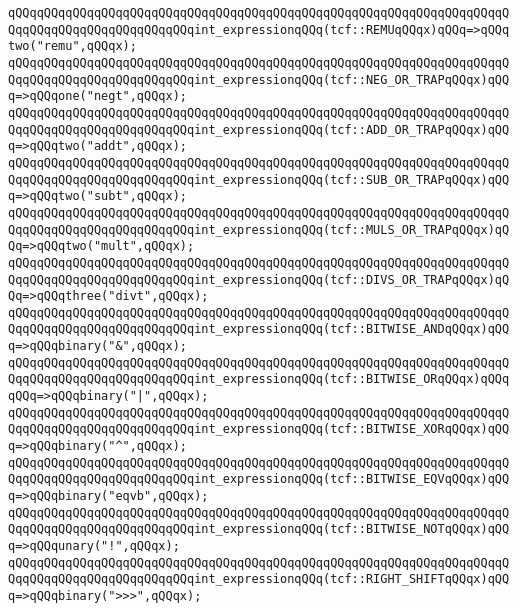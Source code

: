\verb|qQQqqQQqqQQqqQQqqQQqqQQqqQQqqQQqqQQqqQQqqQQqqQQqqQQqqQQqqQQqqQQqqQQqqQQqqQQqqQQqqQQqqQQqqQQqqQQqint_expressionqQQq(tcf::REMUqQQqx)qQQq=>qQQqtwo("remu",qQQqx);|\newline
\verb|qQQqqQQqqQQqqQQqqQQqqQQqqQQqqQQqqQQqqQQqqQQqqQQqqQQqqQQqqQQqqQQqqQQqqQQqqQQqqQQqqQQqqQQqqQQqqQQqint_expressionqQQq(tcf::NEG_OR_TRAPqQQqx)qQQq=>qQQqone("negt",qQQqx);|\newline
\verb|qQQqqQQqqQQqqQQqqQQqqQQqqQQqqQQqqQQqqQQqqQQqqQQqqQQqqQQqqQQqqQQqqQQqqQQqqQQqqQQqqQQqqQQqqQQqqQQqint_expressionqQQq(tcf::ADD_OR_TRAPqQQqx)qQQq=>qQQqtwo("addt",qQQqx);|\newline
\verb|qQQqqQQqqQQqqQQqqQQqqQQqqQQqqQQqqQQqqQQqqQQqqQQqqQQqqQQqqQQqqQQqqQQqqQQqqQQqqQQqqQQqqQQqqQQqqQQqint_expressionqQQq(tcf::SUB_OR_TRAPqQQqx)qQQq=>qQQqtwo("subt",qQQqx);|\newline
\verb|qQQqqQQqqQQqqQQqqQQqqQQqqQQqqQQqqQQqqQQqqQQqqQQqqQQqqQQqqQQqqQQqqQQqqQQqqQQqqQQqqQQqqQQqqQQqqQQqint_expressionqQQq(tcf::MULS_OR_TRAPqQQqx)qQQq=>qQQqtwo("mult",qQQqx);|\newline
\verb|qQQqqQQqqQQqqQQqqQQqqQQqqQQqqQQqqQQqqQQqqQQqqQQqqQQqqQQqqQQqqQQqqQQqqQQqqQQqqQQqqQQqqQQqqQQqqQQqint_expressionqQQq(tcf::DIVS_OR_TRAPqQQqx)qQQq=>qQQqthree("divt",qQQqx);|\newline
\verb|qQQqqQQqqQQqqQQqqQQqqQQqqQQqqQQqqQQqqQQqqQQqqQQqqQQqqQQqqQQqqQQqqQQqqQQqqQQqqQQqqQQqqQQqqQQqqQQqint_expressionqQQq(tcf::BITWISE_ANDqQQqx)qQQq=>qQQqbinary("&",qQQqx);|\newline
\verb|qQQqqQQqqQQqqQQqqQQqqQQqqQQqqQQqqQQqqQQqqQQqqQQqqQQqqQQqqQQqqQQqqQQqqQQqqQQqqQQqqQQqqQQqqQQqqQQqint_expressionqQQq(tcf::BITWISE_ORqQQqx)qQQqqQQq=>qQQqbinary("|\verb#|",qQQqx);#\newline
\verb|qQQqqQQqqQQqqQQqqQQqqQQqqQQqqQQqqQQqqQQqqQQqqQQqqQQqqQQqqQQqqQQqqQQqqQQqqQQqqQQqqQQqqQQqqQQqqQQqint_expressionqQQq(tcf::BITWISE_XORqQQqx)qQQq=>qQQqbinary("^",qQQqx);|\newline
\verb|qQQqqQQqqQQqqQQqqQQqqQQqqQQqqQQqqQQqqQQqqQQqqQQqqQQqqQQqqQQqqQQqqQQqqQQqqQQqqQQqqQQqqQQqqQQqqQQqint_expressionqQQq(tcf::BITWISE_EQVqQQqx)qQQq=>qQQqbinary("eqvb",qQQqx);|\newline
\verb|qQQqqQQqqQQqqQQqqQQqqQQqqQQqqQQqqQQqqQQqqQQqqQQqqQQqqQQqqQQqqQQqqQQqqQQqqQQqqQQqqQQqqQQqqQQqqQQqint_expressionqQQq(tcf::BITWISE_NOTqQQqx)qQQq=>qQQqunary("!",qQQqx);|\newline
\verb|qQQqqQQqqQQqqQQqqQQqqQQqqQQqqQQqqQQqqQQqqQQqqQQqqQQqqQQqqQQqqQQqqQQqqQQqqQQqqQQqqQQqqQQqqQQqqQQqint_expressionqQQq(tcf::RIGHT_SHIFTqQQqx)qQQq=>qQQqbinary(">>>",qQQqx);|\newline
